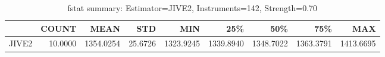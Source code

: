 \begin{table}[ht]
\centering
\caption{fstat summary: Estimator=JIVE2, Instruments=142, Strength=0.70}
\begin{tabular}{lrrrrrrrr}
\toprule
 & COUNT & MEAN & STD & MIN & 25\% & 50\% & 75\% & MAX \\
\midrule
JIVE2 & 10.0000 & 1354.0254 & 25.6726 & 1323.9245 & 1339.8940 & 1348.7022 & 1363.3791 & 1413.6695 \\
\bottomrule
\end{tabular}
\end{table}
